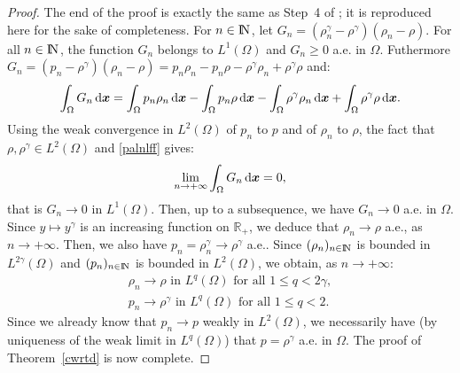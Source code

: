 \documentclass{amsart}
\numberwithin{equation}{section}
\begin{document}
\begin{proof}
\medskip
The end of the proof is exactly the same as Step~4 of \cite[Proof of Theorem 2.2]{eymard2010convergent}; it is reproduced here for the sake of completeness.
For ${{n \in {\ifmmode{\rm	I\mkern-3.1mu
N\mkern0.5mu}\else{\rm I\kern-.16em
N\hskip0.5pt\ }\fi\relax}}}$, let $G_n= (\rho_n^\gamma - \rho^\gamma)(\rho_n - \rho)$.
For all ${{n \in {\ifmmode{\rm	I\mkern-3.1mu
N\mkern0.5mu}\else{\rm I\kern-.16em
N\hskip0.5pt\ }\fi\relax}}}$, the function $G_n$ belongs to $L^1(\Omega)$ and $G_n \ge 0$ a.e. in $\Omega$.
Futhermore $G_n=(p_n -\rho^\gamma)(\rho_n - \rho)= p_n \rho_n-p_n \rho - \rho^\gamma \rho_n  + \rho^\gamma \rho$ and:
\[
\int_\Omega G_n {\, {\rm d}{{\boldsymbol x}}} = \int_\Omega p_n \rho_n {\, {\rm d}{{\boldsymbol x}}} - \int_\Omega p_n \rho {\, {\rm d}{{\boldsymbol x}}}  - \int_\Omega  \rho^\gamma \rho_n {\, {\rm d}{{\boldsymbol x}}} + \int_\Omega \rho^\gamma \rho {\, {\rm d}{{\boldsymbol x}}}.
\]
Using the weak convergence in $L^2(\Omega)$ of $p_n$ to $p$ and of $\rho_n$ to $\rho$, the fact that $\rho, \rho^\gamma \in L^2(\Omega)$
and \eqref{palnlff} gives:
\[
\lim_{{n {\rightarrow} + \infty}} \int_\Omega G_n {\, {\rm d}{{\boldsymbol x}}} =0,
\]
that is $G_n {\rightarrow} 0$ in $L^1(\Omega)$.
Then, up to a subsequence, we have $G_n {\rightarrow} 0$ a.e. in $\Omega$.
Since $y \mapsto y^\gamma$ is an increasing function on ${\mathbb{R}}_+$, we deduce that $\rho_n {\rightarrow} \rho$ a.e., as ${{n {\rightarrow} + \infty}}$.
Then, we also have $p_n = \rho_n^\gamma {\rightarrow} \rho^\gamma$ a.e..
Since $(\rho_n)_{{n \in {\ifmmode{\rm	I\mkern-3.1mu
N\mkern0.5mu}\else{\rm I\kern-.16em
N\hskip0.5pt\ }\fi\relax}}}$ is bounded in $L^{2 \gamma}(\Omega)$ and $(p_n)_{{n \in {\ifmmode{\rm	I\mkern-3.1mu
N\mkern0.5mu}\else{\rm I\kern-.16em
N\hskip0.5pt\ }\fi\relax}}}$ is bounded in $L^2(\Omega)$, we obtain, as ${{n {\rightarrow} + \infty}}$:
\[
\begin{array}{l} \displaystyle
\rho_n {\rightarrow} \rho \textrm{ in } L^q(\Omega) \textrm{ for all } 1 \le q < 2\gamma,
\\[1ex] \displaystyle
p_n {\rightarrow} \rho^\gamma \textrm{ in } L^q(\Omega) \textrm{ for all } 1 \le q < 2.
\end{array}
\]
Since we already know that $p_n {\rightarrow} p$ weakly in $L^2(\Omega)$, we necessarily have (by uniqueness of the weak limit in $L^q(\Omega)$) that $p=\rho^\gamma$ a.e. in $\Omega$.
The proof of Theorem~\ref{cwrtd} is now complete.

\end{proof}
\end{document}
